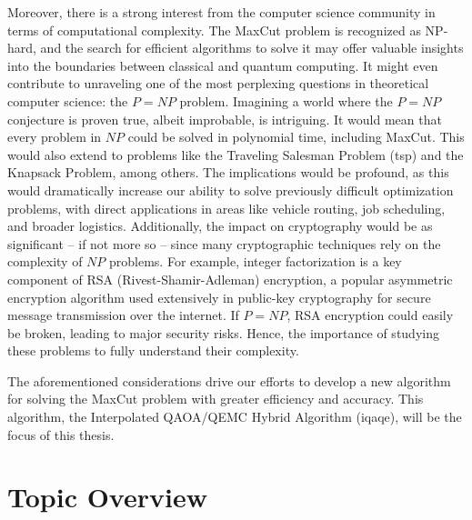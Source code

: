 Moreover, there is a strong interest from the computer science community in terms of computational complexity. The MaxCut problem is recognized as NP-hard, and the search for efficient algorithms to solve it may offer valuable insights into the boundaries between classical and quantum computing. It might even contribute to unraveling one of the most perplexing questions in theoretical computer science: the $P = NP$ problem. Imagining a world where the $P = NP$ conjecture is proven true, albeit improbable, is intriguing. It would mean that every problem in $NP$ could be solved in polynomial time, including MaxCut. This would also extend to problems like the Traveling Salesman Problem (\acrshort{tsp}) and the Knapsack Problem, among others. The implications would be profound, as this would dramatically increase our ability to solve previously difficult optimization problems, with direct applications in areas like vehicle routing, job scheduling, and broader logistics. Additionally, the impact on cryptography would be as significant – if not more so – since many cryptographic techniques rely on the complexity of $NP$ problems. For example, integer factorization is a key component of RSA (Rivest-Shamir-Adleman) encryption, a popular asymmetric encryption algorithm used extensively in public-key cryptography for secure message transmission over the internet. If $P = NP$, RSA encryption could easily be broken, leading to major security risks. Hence, the importance of studying these problems to fully understand their complexity.

The aforementioned considerations drive our efforts to develop a new algorithm for solving the MaxCut problem with greater efficiency and accuracy. This algorithm, the Interpolated QAOA/QEMC Hybrid Algorithm (\acrshort{iqaqe}), will be the focus of this thesis.


\section{Topic Overview}
\label{section:overview}


